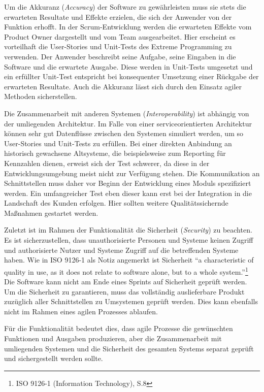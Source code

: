             Um die Akkuranz (\emph{Accuracy}) der Software zu gewährleisten muss sie stets die erwarteten Resultate und Effekte erzielen, die sich der Anwender von der Funktion erhofft. In der Scrum-Entwicklung werden die erwarteten Effekte vom Product Owner dargestellt und vom Team ausgearbeitet. Hier erscheint es vorteilhaft die User-Stories und Unit-Tests des Extreme Programming zu verwenden. Der Anwender beschreibt seine Aufgabe, seine Eingaben in die Software und die erwartete Ausgabe. Diese werden in Unit-Tests umgesetzt und ein erfüllter Unit-Test entspricht bei konsequenter Umsetzung einer Rückgabe der erwarteten Resultate. Auch die Akkuranz lässt sich durch den Einsatz agiler Methoden sicherstellen.

            Die Zusammenarbeit mit anderen Systemen (\emph{Interoperability}) ist abhängig von der umliegenden Architektur. Im Falle von einer serviceorientierten Architektur können sehr gut Datenflüsse zwischen den Systemen simuliert werden, um so User-Stories und Unit-Tests zu erfüllen. Bei einer direkten Anbindung an historisch gewachsene Altsysteme, die beispielsweise zum Reporting für Kennzahlen dienen, erweist sich der Test schwerer, da diese in der Entwicklungsumgebung meist nicht zur Verfügung stehen. Die Kommunikation an Schnittstellen muss daher vor Beginn der Entwicklung eines Moduls spezifiziert werden. Ein umfangreicher Test eben dieser kann erst bei der Integration in die Landschaft des Kunden erfolgen. Hier sollten weitere Qualitätssichernde Maßnahmen gestartet werden.

            Zuletzt ist im Rahmen der Funktionalität die Sicherheit (\emph{Security}) zu beachten. Es ist sicherzustellen, dass unauthorisierte Personen und Systeme keinen Zugriff und authorisierte Nutzer und Systeme Zugriff auf die betreffenden Systeme haben. Wie in ISO 9126-1 als Notiz angemerkt ist Sicherheit \enquote{a characteristic of quality in use, as it does not relate to software alone, but to a whole system.}\footnote{ISO 9126-1 (Information Technology), S.8} Die Software kann nicht am Ende eines Sprints auf Sicherheit geprüft werden. Um die Sicherheit zu garantieren, muss das vollständig auslieferbare Produkt zuzüglich aller Schnittstellen zu Umsystemen geprüft werden. Dies kann ebenfalls nicht im Rahmen eines agilen Prozesses ablaufen.

            Für die Funktionalität bedeutet dies, dass agile Prozesse die gewünschten Funktionen und Ausgaben produzieren, aber die Zusammenarbeit mit umliegenden Systemen und die Sicherheit des gesamten Systems separat geprüft und sichergestellt werden sollte.

